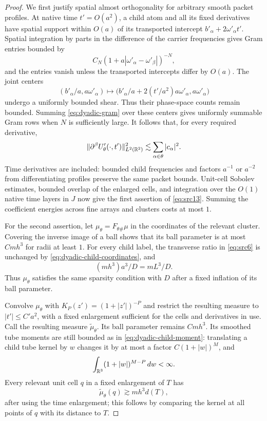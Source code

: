 \begin{proof}
We first justify spatial almost orthogonality for arbitrary smooth
packet profiles.  At native time $t'=O(a^2)$, a child atom and all its
fixed derivatives have spatial support within $O(a)$ of its transported
intercept $b'_\alpha+2\omega'_\alpha t'$.  Spatial integration by
parts in the difference of the carrier frequencies gives Gram entries
bounded by
\begin{equation}\label{eq:dyadic-gram}
 C_N(1+a|\omega'_\alpha-\omega'_\beta|)^{-N},
\end{equation}
and the entries vanish unless the transported intercepts differ by
$O(a)$.  The joint centers
\[
 (b'_\alpha/a,a\omega'_\alpha)
 \longmapsto
 \big(b'_\alpha/a+2(t'/a^2)a\omega'_\alpha,
      a\omega'_\alpha\big)
\]
undergo a uniformly bounded shear.  Thus their phase-space counts remain
bounded.  Summing \eqref{eq:dyadic-gram} over these centers gives
uniformly summable Gram rows when $N$ is sufficiently large.  It follows
that, for every required derivative,
\[
 \|\partial^\beta U'_\theta(\cdot,t')\|_{L^2(\mathbb R^2)}^2
 \lesssim \sum_{\alpha\in\theta}|c_\alpha|^2.
\]
Time derivatives are included: bounded child frequencies and factors
$a^{-1}$ or $a^{-2}$ from differentiating profiles preserve the same
packet bounds.  Unit-cell Sobolev estimates, bounded overlap of the
enlarged cells, and integration over the $O(1)$ native time layers in
$J$ now give the first assertion of \eqref{eq:src13}.  Summing the
coefficient energies across fine arrays and clusters costs at most $1$.

For the second assertion, let $\mu_\theta=F_{\theta\#}\mu$ in the
coordinates of the relevant cluster.  Covering the inverse image of a
ball shows that its ball parameter is at most $Cmh^3$ for radii at
least $1$.  For every child label, the transverse ratio in
\eqref{eq:src6} is unchanged by \eqref{eq:dyadic-child-coordinates},
and
\begin{equation}\label{eq:dyadic-child-moment}
 (mh^3)a^3/D=mL^3/D.
\end{equation}
Thus $\mu_\theta$ satisfies the same sparsity condition with $D$ after
a fixed inflation of its ball parameter.

Convolve $\mu_\theta$ with $K_P(z')=(1+|z'|)^{-P}$ and restrict the
resulting measure to $|t'|\leq C'a^2$, with a fixed enlargement sufficient
for the cells and derivatives in use.  Call the resulting measure
$\widetilde\mu_\theta$.  Its ball parameter remains $Cmh^3$.  Its
smoothed tube moments are still bounded as in
\eqref{eq:dyadic-child-moment}: translating a child tube kernel by $w$
changes it by at most a factor $C(1+|w|)^M$, and
\[
 \int_{\mathbb R^3}(1+|w|)^{M-P}\,dw<\infty.
\]
Every relevant unit cell $q$ in a fixed enlargement of $T$ has
\begin{equation}\label{eq:dyadic-convolved-cell}
 \widetilde\mu_\theta(q)\gtrsim mh^3d(T),
\end{equation}
after using the time enlargement; this follows by comparing the kernel
at all points of $q$ with its distance to $T$.


\end{proof}
